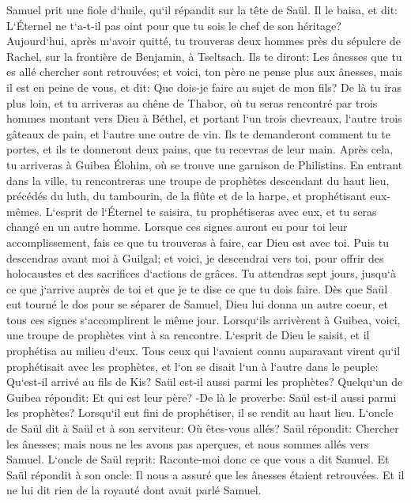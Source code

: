 \verse Samuel prit une fiole d`huile, qu`il répandit sur la tête de Saül. Il le baisa, et dit: L`Éternel ne t`a-t-il pas oint pour que tu sois le chef de son héritage? 
\verse Aujourd`hui, après m`avoir quitté, tu trouveras deux hommes près du sépulcre de Rachel, sur la frontière de Benjamin, à Tseltsach. Ils te diront: Les ânesses que tu es allé chercher sont retrouvées; et voici, ton père ne pense plus aux ânesses, mais il est en peine de vous, et dit: Que dois-je faire au sujet de mon fils? 
\verse De là tu iras plus loin, et tu arriveras au chêne de Thabor, où tu seras rencontré par trois hommes montant vers Dieu à Béthel, et portant l`un trois chevreaux, l`autre trois gâteaux de pain, et l`autre une outre de vin. 
\verse Ils te demanderont comment tu te portes, et ils te donneront deux pains, que tu recevras de leur main. 
\verse Après cela, tu arriveras à Guibea Élohim, où se trouve une garnison de Philistins. En entrant dans la ville, tu rencontreras une troupe de prophètes descendant du haut lieu, précédés du luth, du tambourin, de la flûte et de la harpe, et prophétisant eux-mêmes. 
\verse L`esprit de l`Éternel te saisira, tu prophétiseras avec eux, et tu seras changé en un autre homme. 
\verse Lorsque ces signes auront eu pour toi leur accomplissement, fais ce que tu trouveras à faire, car Dieu est avec toi. 
\verse Puis tu descendras avant moi à Guilgal; et voici, je descendrai vers toi, pour offrir des holocaustes et des sacrifices d`actions de grâces. Tu attendras sept jours, jusqu`à ce que j`arrive auprès de toi et que je te dise ce que tu dois faire. 
\verse Dès que Saül eut tourné le dos pour se séparer de Samuel, Dieu lui donna un autre coeur, et tous ces signes s`accomplirent le même jour. 
\verse Lorsqu`ils arrivèrent à Guibea, voici, une troupe de prophètes vint à sa rencontre. L`esprit de Dieu le saisit, et il prophétisa au milieu d`eux. 
\verse Tous ceux qui l`avaient connu auparavant virent qu`il prophétisait avec les prophètes, et l`on se disait l`un à l`autre dans le peuple: Qu`est-il arrivé au fils de Kis? Saül est-il aussi parmi les prophètes? 
\verse Quelqu`un de Guibea répondit: Et qui est leur père? -De là le proverbe: Saül est-il aussi parmi les prophètes? 
\verse Lorsqu`il eut fini de prophétiser, il se rendit au haut lieu. 
\verse L`oncle de Saül dit à Saül et à son serviteur: Où êtes-vous allés? Saül répondit: Chercher les ânesses; mais nous ne les avons pas aperçues, et nous sommes allés vers Samuel. 
\verse L`oncle de Saül reprit: Raconte-moi donc ce que vous a dit Samuel. 
\verse Et Saül répondit à son oncle: Il nous a assuré que les ânesses étaient retrouvées. Et il ne lui dit rien de la royauté dont avait parlé Samuel. 
